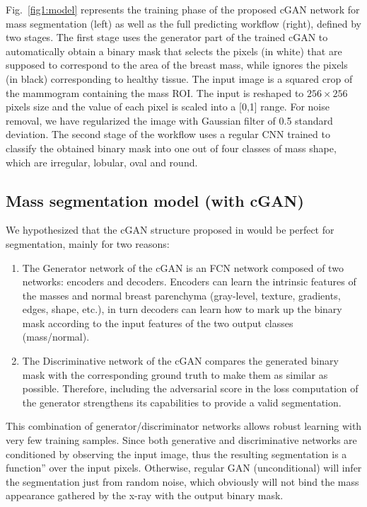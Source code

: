 \documentclass[runningheads,a4paper]{llncs}
\begin{document}
Fig.~\ref{fig1:model} represents the training phase of the proposed cGAN network for mass segmentation (left) as well as the full predicting workflow (right), defined by two stages. The first stage uses the generator part of the trained cGAN to automatically obtain a binary mask that selects the pixels (in white) that are supposed to correspond to the area of the breast mass, while ignores the pixels (in black) corresponding to healthy tissue. The input image is a squared crop of the mammogram containing the mass ROI. The input is reshaped to $256\times 256$ pixels size and the value of each pixel is scaled into a [0,1] range. For noise removal, we have regularized the image with Gaussian filter of 0.5 standard deviation. The second stage of the workflow uses a regular CNN trained to classify the obtained binary mask into one out of four classes of mass shape, which are irregular, lobular, oval and round.



\subsection{Mass segmentation model (with cGAN)}

We hypothesized that the cGAN structure proposed in \cite{isola2017image} would be perfect for segmentation, mainly for two reasons:

\begin{enumerate}
  \item The Generator network of the cGAN is an FCN network composed of two networks: encoders and decoders. Encoders can learn the intrinsic features of the masses and normal breast parenchyma (gray-level, texture, gradients, edges, shape, etc.), in turn decoders can learn how to mark up the binary mask according to the input features of the two output classes (mass/normal).
  \item The Discriminative network of the cGAN compares the generated binary mask with the corresponding ground truth to make them as similar as possible. Therefore, including the adversarial score in the loss computation of the generator strengthens its capabilities to provide a valid segmentation.
\end{enumerate}

This combination of generator/discriminator networks allows robust learning with very few training samples. Since both generative and discriminative networks are conditioned by observing the input image, thus the resulting segmentation is a function” over the input pixels. Otherwise, regular GAN (unconditional) will infer the segmentation just from random noise, which obviously will not bind the mass appearance gathered by the x-ray with the output binary mask.
\end{document}
